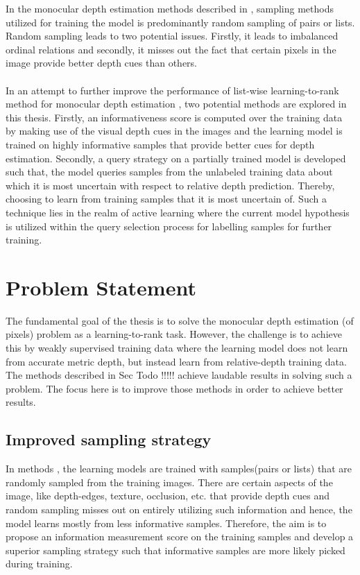 In the monocular depth estimation methods described in \cite{xian2018monocular,chen2016single,Lienen_2021_CVPR}, sampling methods utilized for training the model is predominantly random sampling of pairs or lists. Random sampling leads to two potential issues. Firstly, it leads to imbalanced ordinal relations\cite{xian2018monocular} and secondly, it misses out the fact that certain pixels in the image provide better depth cues than others. 
\\\\
In an attempt to further improve the performance of list-wise learning-to-rank method for monocular depth estimation \cite{Lienen_2021_CVPR}, two potential methods are explored in this thesis. 
Firstly, an informativeness score is computed over the training data by making use of the visual depth cues in the images and the learning model is trained on highly informative samples that provide better cues for depth estimation. 
Secondly, a query strategy on a partially trained model is developed such that, the model queries samples from the unlabeled training data about which it is most uncertain with respect to relative depth prediction. Thereby, choosing to learn from training samples that it is most uncertain of. Such a technique lies in the realm of active learning\cite{settles2009active} where the current model hypothesis is utilized within the query selection process for labelling samples for further training.




\section{Problem Statement}

The fundamental goal of the thesis is to solve the monocular depth estimation (of pixels) problem as a learning-to-rank task. However, the challenge is to achieve this by weakly supervised training data where the learning model does not learn from accurate metric depth, but instead learn from relative-depth training data. The methods described in Sec Todo !!!!! achieve laudable results in solving such a problem. The focus here is to improve those methods in order to achieve better results.

\subsection{Improved sampling strategy}
In methods \cite{xian2018monocular, chen2016single, Lienen_2021_CVPR}, the learning models are trained with samples(pairs or lists) that are randomly sampled from the training images. There are certain aspects of the image, like depth-edges, texture, occlusion, etc. that provide depth cues and random sampling misses out on entirely utilizing such information and hence, the model learns mostly from less informative samples.
Therefore, the aim is to propose an information measurement score on the training samples and develop a superior sampling strategy such that informative samples are more likely picked during training.

